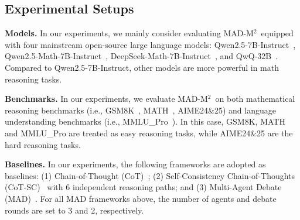 \documentclass{article} %
\newcommand{\mymark}[1]{\textcolor{red}{#1}}
\newcommand{\methodname}{MAD-M$^2$}
\theoremstyle{plain}
\begin{document}
\vspace{-8pt}
\subsection{Experimental Setups}
\label{subsec:setups}
\vspace{-4pt}
\textbf{Models.} In our experiments, we mainly consider evaluating \methodname\ equipped with four mainstream open-source large language models: Qwen2.5-7B-Instruct~\citep{qwen2.5}, Qwen2.5-Math-7B-Instruct~\citep{qwen25math}, DeepSeek-Math-7B-Instruct~\citep{shao2024deepseekmath}, and QwQ-32B~\citep{qwq32b}. Compared to Qwen2.5-7B-Instruct, other models are more powerful in math reasoning tasks. %


\textbf{Benchmarks.} In our experiments, we evaluate \methodname\ on both mathematical reasoning benchmarks (i.e., GSM8K~\citep{gsm8k_dataset}, MATH~\citep{math_dataset}, AIME24\&25) and language understanding benchmarks (i.e., MMLU\_Pro~\citep{wang2024mmlu}). In this case, GSM8K, MATH and MMLU\_Pro are treated as easy reasoning tasks, while AIME24\&25 are the hard reasoning tasks.

\textbf{Baselines.} %
In our experiments, the following frameworks are adopted as baselines: (1) Chain-of-Thought (CoT)~\citep{cot}; (2) Self-Consistency Chain-of-Thoughts (CoT-SC)~\citep{cot_sc} with 6 independent reasoning paths; and (3) Multi-Agent Debate (MAD)~\citep{mad_yilun}. For all MAD frameworks above, the number of agents and debate rounds are set to 3 and 2, respectively. 

\end{document}
